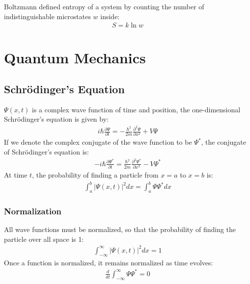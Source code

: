 \documentclass[11pt]{article}
\newcommand{\cc}[1]{
  \ensuremath{#1^{\ast}}}               %
\newcommand{\pd}[2]{
  \ensuremath{
    \frac{\partial #1}{\partial #2} }} %
\begin{document}
\begin{multicols*}{3}
\noindent
Boltzmann defined entropy of a system by counting the number of indistinguishable microstates $w$ inside:
\begin{align*}
  S = k \ln w
\end{align*}

\section{Quantum Mechanics}
\subsection{Schr\"{o}dinger's Equation}
$\Psi(x, t)$ is a complex wave function of time and position, the one-dimensional Schr\"{o}dinger's equation is given by:
\begin{align*}
i \hbar \pd{\Psi}{t} = - \frac{\hbar^2}{2m} \pd{^2 \Psi}{x^2} + V\Psi
\end{align*}
If we denote the complex conjugate of the wave function to be $\cc{\Psi}$, the conjugate of Schr\"{o}dinger's equation is:
\begin{align*}
-i \hbar \pd{\cc{\Psi}}{t} = \frac{\hbar^2}{2m} \pd{^2 \cc{\Psi}}{x^2} - V\cc{\Psi}
\end{align*}
At time $t$, the probability of finding a particle from $x=a$ to $x=b$ is:
\begin{align*}
\int_{a}^{b} |\Psi(x, t)|^2 dx = \int_{a}^{b}\Psi\cc{\Psi}dx
\end{align*}
\subsubsection{Normalization}
All wave functions must be normalized, so that the probability of finding the particle over all space is 1:
\begin{align*}
\int_{-\infty}^{\infty} |\Psi(x,t)|^2 dx = 1
\end{align*}
Once a function is normalized, it remains normalized as time evolves:
\begin{align*}
\frac{d}{dt} \int_{-\infty}^{\infty} \Psi \cc{\Psi} = 0
\end{align*}

\end{multicols*}
\end{document}
